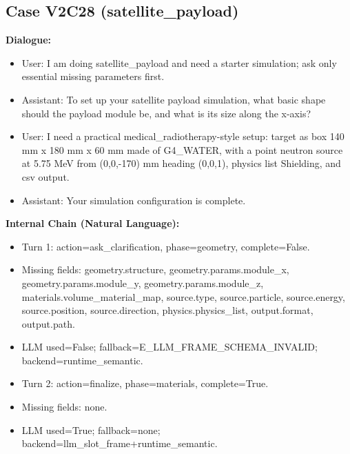 \documentclass[11pt]{ctexart}
\begin{document}
\subsection{Case V2C28 (satellite\_payload)}
\textbf{Dialogue:}
\begin{itemize}
\item User: I am doing satellite\_payload and need a starter simulation; ask only essential missing parameters first.
\item Assistant: To set up your satellite payload simulation, what basic shape should the payload module be, and what is its size along the x-axis?
\item User: I need a practical medical\_radiotherapy-style setup: target as box 140 mm x 180 mm x 60 mm made of G4\_WATER, with a point neutron source at 5.75 MeV from (0,0,-170) mm heading (0,0,1), physics list Shielding, and csv output.
\item Assistant: Your simulation configuration is complete.
\end{itemize}
\textbf{Internal Chain (Natural Language):}
\begin{itemize}
\item Turn 1: action=ask\_clarification, phase=geometry, complete=False.
\item Missing fields: geometry.structure, geometry.params.module\_x, geometry.params.module\_y, geometry.params.module\_z, materials.volume\_material\_map, source.type, source.particle, source.energy, source.position, source.direction, physics.physics\_list, output.format, output.path.
\item LLM used=False; fallback=E\_LLM\_FRAME\_SCHEMA\_INVALID; backend=runtime\_semantic.
\item Turn 2: action=finalize, phase=materials, complete=True.
\item Missing fields: none.
\item LLM used=True; fallback=none; backend=llm\_slot\_frame+runtime\_semantic.
\end{itemize}
\end{document}
